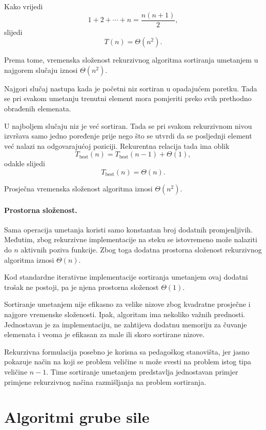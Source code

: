  Kako vrijedi
 \[
 1+2+\cdots+n=\frac{n(n+1)}{2},
 \]
 slijedi
 \[
 T(n)=\Theta(n^2).
 \]
 
 Prema tome, vremenska složenost rekurzivnog algoritma sortiranja umetanjem
 u najgorem slučaju iznosi ${\Theta(n^2)}.$
 
 Najgori slučaj nastupa kada je početni niz sortiran u opadajućem poretku.
 Tada se pri svakom umetanju trenutni element mora pomjeriti preko svih
 prethodno obrađenih elemenata.
 
 U najboljem slučaju niz je već sortiran. Tada se pri svakom rekurzivnom
 nivou izvršava samo jedno poređenje prije nego što se utvrdi da se
 posljednji element već nalazi na odgovarajućoj poziciji. Rekurentna relacija
 tada ima oblik
 \[
 T_{\mathrm{best}}(n)
 =
 T_{\mathrm{best}}(n-1)+\Theta(1),
 \]
 odakle slijedi
 \[
 T_{\mathrm{best}}(n)=\Theta(n).
 \]
 
 Prosječna vremenska složenost algoritma iznosi $
 \Theta(n^2).$
 
 \paragraph{Prostorna složenost.}
 Sama operacija umetanja koristi samo konstantan broj dodatnih promjenljivih.
 Međutim, zbog rekurzivne implementacije na steku se istovremeno može nalaziti
 do $n$ aktivnih poziva funkcije. Zbog toga dodatna prostorna složenost
 rekurzivnog algoritma iznosi $\Theta(n)$.
 
 Kod standardne iterativne implementacije sortiranja umetanjem ovaj dodatni
 trošak ne postoji, pa je njena prostorna složenost $\Theta(1)$.
 
 Sortiranje umetanjem nije efikasno za velike nizove zbog kvadratne prosječne
 i najgore vremenske složenosti. Ipak, algoritam ima nekoliko važnih
 prednosti. Jednostavan je za implementaciju, ne zahtijeva dodatnu memoriju
 za čuvanje elemenata i veoma je efikasan za male ili skoro sortirane nizove.
 
 Rekurzivna formulacija posebno je korisna sa pedagoškog stanovišta, jer
 jasno pokazuje način na koji se problem veličine $n$ može svesti na problem
 istog tipa veličine $n-1$. Time sortiranje umetanjem predstavlja jednostavan
 primjer primjene rekurzivnog načina razmišljanja na problem sortiranja.

\section{Algoritmi grube sile}

